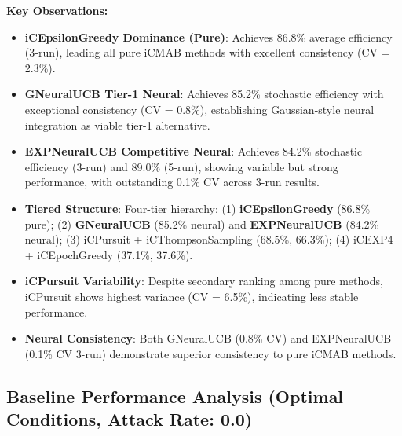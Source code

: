 \documentclass[12pt,a4paper]{article}
\newcommand{\primarytext}[1]{\textcolor{primaryblue}{\textbf{#1}}}
\newcommand{\secondarytext}[1]{\textcolor{secondaryblue}{\textbf{#1}}}
\newcommand{\warning}[1]{\textcolor{warningred}{\textbf{#1}}}
\newcommand{\legacy}[1]{\textcolor{legacycolor}{\textbf{#1}}}
\newcommand{\neural}[1]{\textcolor{neuralcolor}{\textbf{#1}}}
\begin{document}
\begin{tcolorbox}[colback=tableheader,colframe=primaryblue,title=\textbf{Primary iCMAB Performance Results (Stochastic Environment, Attack Rate: 0.25)}]
\textbf{Key Observations:}
\begin{itemize}
\item \primarytext{iCEpsilonGreedy Dominance (Pure)}: Achieves 86.8\% average efficiency (3-run), leading all pure iCMAB methods with excellent consistency (CV = 2.3\%).
\item \neural{GNeuralUCB Tier-1 Neural}: Achieves 85.2\% stochastic efficiency with exceptional consistency (CV = 0.8\%), establishing Gaussian-style neural integration as viable tier-1 alternative.
\item \legacy{EXPNeuralUCB Competitive Neural}: Achieves 84.2\% stochastic efficiency (3-run) and 89.0\% (5-run), showing variable but strong performance, with outstanding 0.1\% CV across 3-run results.
\item \secondarytext{Tiered Structure}: Four-tier hierarchy: (1) \primarytext{iCEpsilonGreedy} (86.8\% pure); (2) \neural{GNeuralUCB} (85.2\% neural) and \legacy{EXPNeuralUCB} (84.2\% neural); (3) iCPursuit + iCThompsonSampling (68.5\%, 66.3\%); (4) iCEXP4 + iCEpochGreedy (37.1\%, 37.6\%).
\item \warning{iCPursuit Variability}: Despite secondary ranking among pure methods, iCPursuit shows highest variance (CV = 6.5\%), indicating less stable performance.
\item \neural{Neural Consistency}: Both GNeuralUCB (0.8\% CV) and EXPNeuralUCB (0.1\% CV 3-run) demonstrate superior consistency to pure iCMAB methods.
\end{itemize}
\end{tcolorbox}

\subsection{Baseline Performance Analysis (Optimal Conditions, Attack Rate: 0.0)}
\end{document}
